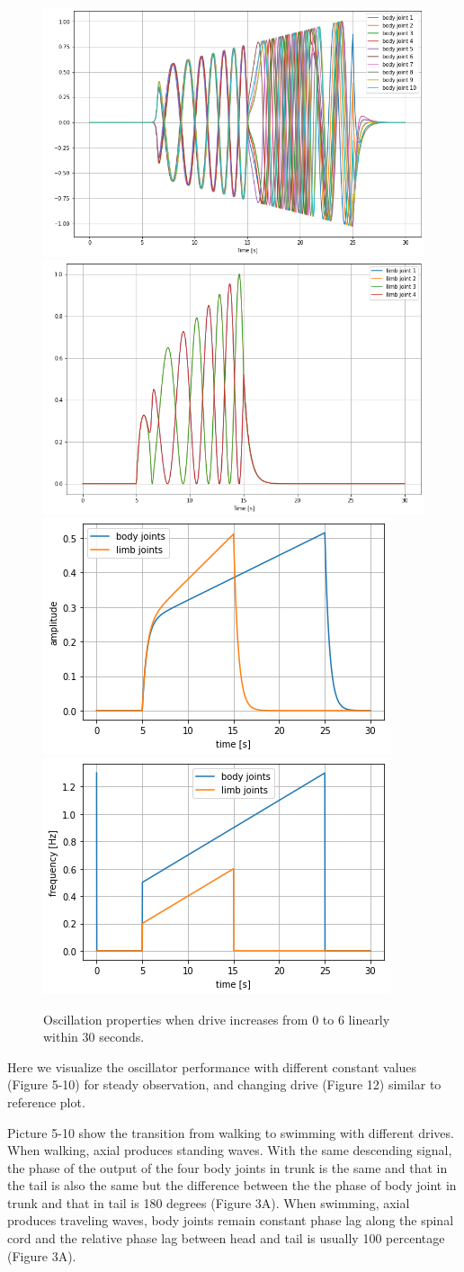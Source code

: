 \documentclass{cmc}
\begin{document}
\begin{figure}[H]
\centering
\includegraphics[height=0.3\columnwidth]{figures/8a_spine.png}
\includegraphics[height=0.3\columnwidth]{figures/8a_limb.png}
\includegraphics[height=0.3\columnwidth]{figures/8a_amp.png}
\includegraphics[height=0.3\columnwidth]{figures/8a_freq.png}
\caption{Oscillation properties when drive increases from 0 to 6 linearly within 30 seconds.}
\label{a_f}
\end{figure}

Here we visualize the oscillator performance with different constant values (Figure 5-10) for steady observation, and changing drive (Figure 12) similar to reference plot.

Picture 5-10 show the transition from walking to swimming with different drives. When walking, axial produces standing waves. With the same descending signal, the phase of the output of the four body joints in trunk is the same and that in the tail is also the same but the difference between the the phase of body joint in trunk and that in tail is 180 degrees (Figure 3A). When swimming, axial produces traveling waves, body joints remain constant phase lag along the spinal cord and the relative phase lag between head and tail is usually 100 percentage (Figure 3A).
\end{document}
